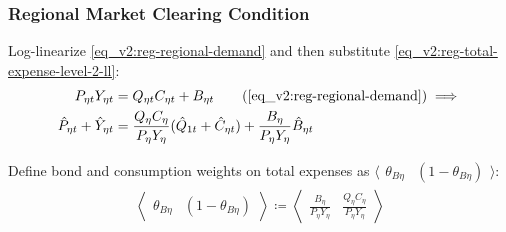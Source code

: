 \documentclass[../thesis.tex]{subfiles}
\begin{document}
	
	\begin{comment}
		Define the regional weights $\langle \begin{matrix} \theta_{PY1} & (1-\theta_{PY1}) \end{matrix} \rangle$ in the gross domestic production:
		\begin{align}
			\left\langle \begin{matrix} \theta_{PY1} & (1-\theta_{PY1}) \end{matrix} \right\rangle \coloneq \left\langle \begin{matrix} \frac{P_{1} Y_{1}}{P Y} & \frac{P_{2} Y_{2}}{PY} \end{matrix} \right\rangle \label{eq_v2:reg-ss-PYn-weight-in-PY}
		\end{align}
		
		Substitute \ref{eq_v2:reg-ss-PYn-weight-in-PY} in \ref{eq_v2:reg-ll-national-price-level}:
		
	\end{comment}


\subsubsection*{Regional Market Clearing Condition}

Log-linearize \ref{eq_v2:reg-regional-demand} and then substitute \ref{eq_v2:reg-total-expense-level-2-ll}:
\begin{align}
	P_{\eta t} Y_{\eta t} &= Q_{\eta t} C_{\eta t} + B_{\eta t} \tag{\ref{eq_v2:reg-regional-demand}} \implies \\
	\hat{P}_{\eta t} + \hat{Y}_{\eta t} &= \frac{Q_{\eta} C_{\eta}}{P_{\eta} Y_{\eta}} (\hat{Q}_{1t} + \hat{C}_{\eta t}) + \frac{B_{\eta}}{P_{\eta} Y_{\eta}} \hat{B}_{\eta t} \label{eq_v2:reg-regional-demand-ll}
\end{align}


Define bond and consumption weights on total expenses as $\langle \begin{matrix} \theta_{B \eta} & (1-\theta_{B \eta}) \end{matrix} \rangle$:
\begin{align}
	\left\langle \begin{matrix} \theta_{B \eta} & (1-\theta_{B \eta}) \end{matrix} \right\rangle \coloneq \left\langle \begin{matrix} \frac{B_{\eta}}{P_{\eta} Y_{\eta}} & \frac{Q_{\eta} C_{\eta}}{P_{\eta} Y_{\eta}} \end{matrix} \right\rangle \label{eq_v2:reg-ss-Q-weight-in-Y} \end{align}
\end{document}
